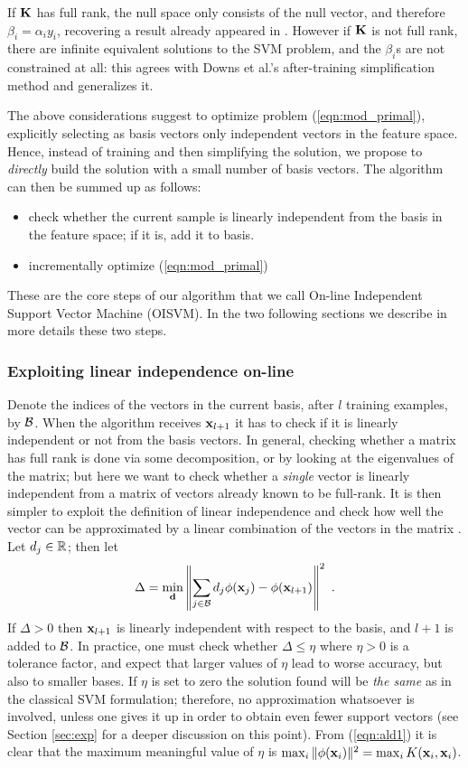 If $\mathbf{K}$ has full rank, the null space only consists of the null
vector, and therefore $\beta_i = \alpha_i y_i$, recovering a result
already appeared in \cite{KeerthiCDC06}.
However if $\mathbf{K}$ is not full rank, there are infinite equivalent solutions
to the SVM problem, and the $\beta_i$s are not
constrained at all: this agrees with Downs et al.'s \cite{DownsGM01}
after-training simplification method and generalizes it.

The above considerations suggest to optimize problem (\ref{eqn:mod_primal}),
explicitly selecting as basis vectors only independent vectors in the feature space.
Hence, instead of training and then simplifying the solution, we propose to \emph{directly}
build the solution with a small number of basis vectors.
The algorithm can then be summed up as follows:
\begin{itemize}
\item check whether the current sample is linearly independent from the basis in the feature space;
if it is, add it to basis.
\item incrementally optimize (\ref{eqn:mod_primal})
\end{itemize}
These are the core steps of our algorithm that we call On-line Independent
Support Vector Machine (OISVM). In the two following sections we describe in
more details these two steps.

\subsubsection{Exploiting linear independence on-line}
Denote the indices of the vectors in the current basis, after $l$ training
examples, by $\mathcal{B}$. When the algorithm receives $\mathbf{x}_{l+1}$ it has to check
if it is linearly independent or not from the basis vectors.
In general, checking whether a matrix has full rank is done via some
decomposition, or by looking at the eigenvalues of the matrix; but
here we want to check whether a \emph{single} vector is linearly
independent from a matrix of vectors already known to be full-rank.
It is then simpler to exploit the definition of linear independence
and check how well the vector can be approximated by a linear combination
of the vectors in the matrix \cite{EngelMM04}. Let $d_j \in \mathbb{R}$; then
let
%
\begin{equation} \label{eqn:ald1}
  \Delta = \min_{\mathbf{d}} \left\| \sum_{j \in \mathcal{B}} d_j \phi(\mathbf{x}_j) - \phi(\mathbf{x}_{l+1}) \right\|^2~.
\end{equation}
%
\noindent If $\Delta > 0$ then $\mathbf{x}_{l+1}$ is linearly independent with respect
to the basis, and $l+1$ is added to $\mathcal{B}$. In practice, one must check
whether $\Delta \leq \eta$ where $\eta > 0$ is a tolerance factor, and
expect that larger values of $\eta$ lead to worse accuracy, but also
to smaller bases. If $\eta$ is set to zero the solution found will be \emph{the same}
as in the classical SVM formulation; therefore, no approximation whatsoever is involved,
unless one gives it up in order to obtain even fewer support vectors
(see Section \ref{sec:exp} for a deeper discussion on this point).
From (\ref{eqn:ald1}) it is clear that the maximum meaningful value of
$\eta$ is $\max_i \|\phi(\mathbf{x}_i)\|^2= \max_i K(\mathbf{x}_i,\mathbf{x}_i)$.

